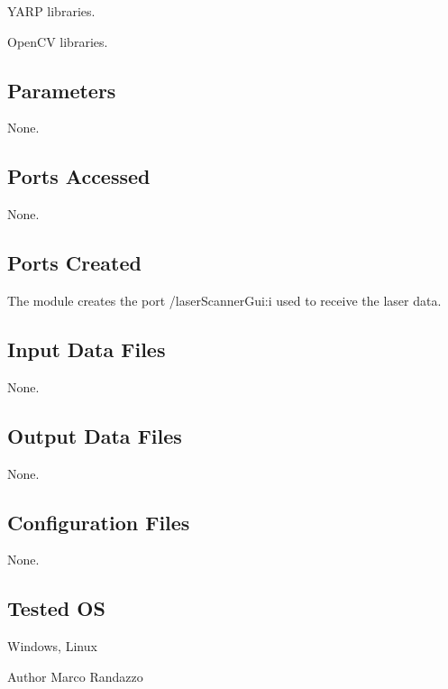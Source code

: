 \begin{DoxyItemize}
\item Y\+A\+R\+P libraries.
\item Open\+C\+V libraries.
\end{DoxyItemize}\hypertarget{group__laserScannerGui_parameters_sec}{}\subsection{Parameters}\label{group__laserScannerGui_parameters_sec}
None.\hypertarget{group__laserScannerGui_portsa_sec}{}\subsection{Ports Accessed}\label{group__laserScannerGui_portsa_sec}
None.\hypertarget{group__laserScannerGui_portsc_sec}{}\subsection{Ports Created}\label{group__laserScannerGui_portsc_sec}
The module creates the port /laser\+Scanner\+Gui\+:i used to receive the laser data.\hypertarget{group__laserScannerGui_in_files_sec}{}\subsection{Input Data Files}\label{group__laserScannerGui_in_files_sec}
None.\hypertarget{group__laserScannerGui_out_data_sec}{}\subsection{Output Data Files}\label{group__laserScannerGui_out_data_sec}
None.\hypertarget{group__laserScannerGui_conf_file_sec}{}\subsection{Configuration Files}\label{group__laserScannerGui_conf_file_sec}
None.\hypertarget{group__laserScannerGui_tested_os_sec}{}\subsection{Tested O\+S}\label{group__laserScannerGui_tested_os_sec}
Windows, Linux

\begin{DoxyAuthor}{Author}
Marco Randazzo 
\end{DoxyAuthor}
